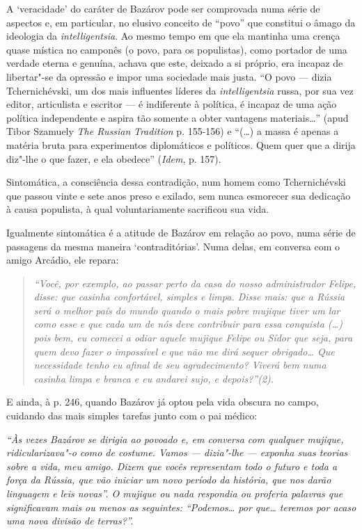A `veracidade' do caráter de Bazárov pode ser comprovada numa série de
aspectos e, em particular, no elusivo conceito de ``povo'' que constitui
o âmago da ideologia da \emph{intelligentsia}. Ao mesmo tempo em que ela
mantinha uma crença quase mística no camponês (o povo, para os
populistas), como portador de uma verdade eterna e genuína, achava que
este, deixado a si próprio, era incapaz de libertar"-se da opressão e
impor uma sociedade mais justa. ``O povo --- dizia Tchernichévski, um dos
mais influentes líderes da \emph{intelligentsia} russa, por sua vez
editor, articulista e escritor --- é indiferente à política, é incapaz de
uma ação política independente e aspira tão somente a obter vantagens
materiais\ldots{}'' (apud Tibor Szamuely \emph{The Russian} { }
\emph{Tradition} p. 155-156) e ``(\ldots{}) a massa é apenas a matéria bruta
para experimentos diplomáticos e políticos. Quem quer que a dirija
diz"-lhe o que fazer, e ela obedece'' (\emph{Idem}, p. 157).

Sintomática, a consciência dessa contradição, num homem como
Tchernichévski que passou vinte e sete anos preso e exilado, sem nunca
esmorecer sua dedicação à causa populista, à qual voluntariamente
sacrificou sua vida.

Igualmente sintomática é a atitude de Bazárov em relação ao povo, numa
série de passagens da mesma maneira `contraditórias'. Numa delas, em
conversa com o amigo Arcádio, ele repara:

\begin{quote}
\emph{``Você, por exemplo, ao passar perto da casa do nosso
administrador Felipe, disse: que casinha confortável, simples e limpa.
Disse mais: que a Rússia será o melhor país do mundo quando o mais pobre
mujique tiver um lar como esse e que cada um de nós deve contribuir para
essa conquista (\ldots{}) pois bem, eu comecei a odiar aquele mujique Felipe
ou Sídor que seja, para quem devo fazer o impossível e que não me dirá
sequer obrigado\ldots{} Que necessidade tenho eu afinal de seu
agradecimento? Viverá bem numa casinha limpa e branca e eu andarei sujo,
e depois?''(2). }
\end{quote}

E ainda, à p. 246, quando Bazárov já optou pela vida obscura no campo,
cuidando das mais simples tarefas junto com o pai médico:

\emph{``Às vezes Bazárov se dirigia ao povoado e, em conversa com
qualquer mujique, ridicularizava"-o como de costume. Vamos --- dizia"-lhe
--- exponha suas teorias sobre a vida, meu amigo. Dizem que vocês
representam todo o futuro e toda a força da Rússia, que vão iniciar um
novo período da história, que nos darão linguagem e leis novas''. O
mujique ou nada respondia ou proferia palavras que significavam mais ou
menos as seguintes: ``Podemos\ldots{} por que\ldots{} teremos por acaso uma
nova divisão de terras?''.}

